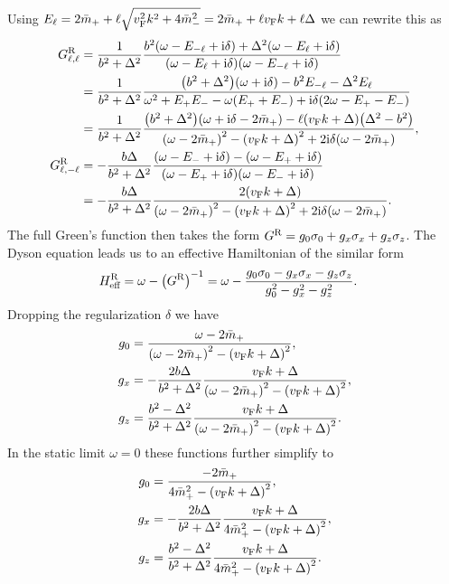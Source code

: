 \documentclass[english, parskip=full]{scrartcl}
\begin{document}
Using $E_\ell = 2\bar{m}_+ + \ell \sqrt{\vf^2k^2 + 4\bar{m}_-^2} = 2\bar{m}_+ + \ell \vf k + \ell \Delta$ we can rewrite this as
\begin{align}
G_{\ell,\ell}^\R &= \frac{1}{b^2+\Delta^2} \frac{b^2 \kla*{\omega - E_{-\ell} + \i\delta} + \Delta^2 \kla*{\omega - E_{\ell} + \i\delta}}{\kla*{\omega - E_{\ell} + \i\delta} \kla*{\omega - E_{-\ell} + \i\delta}} \\
&= \frac{1}{b^2+\Delta^2} \frac{\kla*{b^2 + \Delta^2} \kla*{\omega + \i\delta} - b^2 E_{-\ell} - \Delta^2 E_\ell}{\omega^2 + E_+E_- - \omega (E_++E_-) + \i\delta \kla*{2\omega - E_+ - E_-}}\\
&= \frac{1}{b^2+\Delta^2} \frac{\kla*{b^2 + \Delta^2} \kla*{\omega + \i\delta - 2\bar{m}_+} - \ell \kla*{\vf k + \Delta} \kla*{\Delta^2 - b^2}}{\kla*{\omega - 2\bar{m}_+}^2 - \kla*{\vf k + \Delta}^2 + 2\i\delta \kla*{\omega - 2\bar{m}_+}},\\
G_{\ell,-\ell}^\R &= -\frac{b\Delta}{b^2+\Delta^2} \frac{\kla*{\omega - E_{-} + \i\delta} - \kla*{\omega - E_{+} + \i\delta}}{\kla*{\omega - E_{+} + \i\delta} \kla*{\omega - E_{-} + \i\delta}}\\
&= -\frac{b\Delta}{b^2+\Delta^2} \frac{2\kla*{\vf k + \Delta}}{\kla*{\omega - 2\bar{m}_+}^2 - \kla*{\vf k + \Delta}^2 + 2\i\delta \kla*{\omega - 2\bar{m}_+}}.
\end{align}
The full Green's function then takes the form $G^\R = g_0\sigma_0 + g_x\sigma_x + g_z\sigma_z$.
The Dyson equation leads us to an effective Hamiltonian of the similar form
\begin{align}
H_\Text{eff}^\R &= \omega - \kla*{G^\R}^{-1} = \omega - \frac{g_0\sigma_0 - g_x\sigma_x - g_z\sigma_z}{g_0^2 - g_x^2 - g_z^2}.
\end{align}
Dropping the regularization $\delta$ we have
\begin{align}
g_0 &= \frac{\omega - 2\bar{m}_+}{\kla*{\omega - 2\bar{m}_+}^2 - \kla*{\vf k + \Delta}^2},\\
g_x &= -\frac{2b\Delta}{b^2+\Delta^2} \frac{\vf k + \Delta}{\kla*{\omega - 2\bar{m}_+}^2 - \kla*{\vf k + \Delta}^2},\\
g_z &= \frac{b^2-\Delta^2}{b^2+\Delta^2} \frac{\vf k + \Delta}{\kla*{\omega - 2\bar{m}_+}^2 - \kla*{\vf k + \Delta}^2}.
\end{align}
In the static limit $\omega=0$ these functions further simplify to
\begin{align}
g_0 &= \frac{-2\bar{m}_+}{4\bar{m}_+^2 - \kla*{\vf k + \Delta}^2},\\
g_x &= -\frac{2b\Delta}{b^2+\Delta^2} \frac{\vf k + \Delta}{4\bar{m}_+^2 - \kla*{\vf k + \Delta}^2},\\
g_z &= \frac{b^2-\Delta^2}{b^2+\Delta^2} \frac{\vf k + \Delta}{4\bar{m}_+^2 - \kla*{\vf k + \Delta}^2}.
\end{align}
\end{document}
